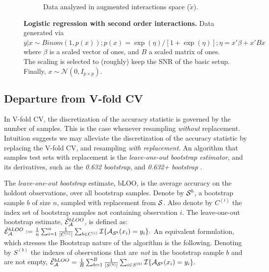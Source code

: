 \documentclass[]{bio}
\begin{document}
\begin{figure}[th]
\begin{subfigure}[t]{.45\columnwidth}
		\caption{Data analyzed in augmented interactions space ($\tilde x$).}
		\label{fig:interactions-in-augmented-space}
	\end{subfigure}
	\caption{\textbf{Logistic regression with second order interactions.} 
		Data generated via $y|x \sim Binom(1,p(x));
		p(x)=\exp(\eta)/[1+\exp(\eta)];
		\eta=x'\beta+x'Bx$ where 
		$\beta$ is a scaled vector of ones, and $B$ a scaled matrix of ones.
		The scaling is selected to (roughly) keep the SNR of the basic setup. 
		Finally, $x\sim \mathcal{N}(0,I_{p\times p})$.
	 } 
	\label{fig:logistic-main-and-interactions}
\end{figure}





\subsection{Departure from V-fold CV}
\label{sec:bootstrap}

In V-fold CV, the discretization of the accuracy statistic is governed by the number of samples. 
This is the case whenever resampling \emph{without} replacement. 
Intuition suggests we may alleviate the discretization of the accuracy statistic by replacing the V-fold CV, and resampling \emph{with replacement}.
An algorithm that samples test sets with replacement is the \emph{leave-one-out bootstrap estimator},  and its derivatives, such as the \emph{0.632 bootstrap}, and \emph{0.632+ bootstrap} \cite[Sec 7.11]{hastie_elements_2003}.
\begin{definition}[bLOO]
	\label{def:bloo}
	The \emph{leave-one-out bootstrap} estimate, bLOO, is the average accuracy on the holdout observations, over all bootstrap samples. 
	Denote by $\mathcal{S}^b$, a bootstrap sample $b$ of size $n$, sampled with replacement from $\mathcal{S}$. 
	Also denote by $C^{(i)}$ the index set of bootstrap samples not containing observation $i$.
	The leave-one-out bootstrap estimate, $\hat{\mathcal{E}}_{\mathcal{A}}^{bLOO}$,  is defined as:
	$\hat{\mathcal{E}}_{\mathcal{A}}^{bLOO}:= \frac 1n \sum_{i=1}^{n} \frac{1}{|C^{(i)}|} \sum_{b \in C^{(i)}} \mathcal{I}{\{ \mathcal{A}_{\mathcal{S}^b}(x_i)=y_i \}}.$
	An equivalent formulation, which stresses the Bootstrap nature of the algorithm is the following. 
	Denoting by $S^{(b)}$ the indexes of observations that are \emph{not} in the bootstrap sample $b$ and are not empty, 
	$\hat{\mathcal{E}}_{\mathcal{A}}^{bLOO} = \frac 1B \sum_{b=1}^{B} \frac{1}{|S^{(b)}|} \sum_{i \in S^{(b)}} \mathcal{I}{\{ \mathcal{A}_{\mathcal{S}^b}(x_i)=y_i \}}.$
\end{definition}
\end{document}
